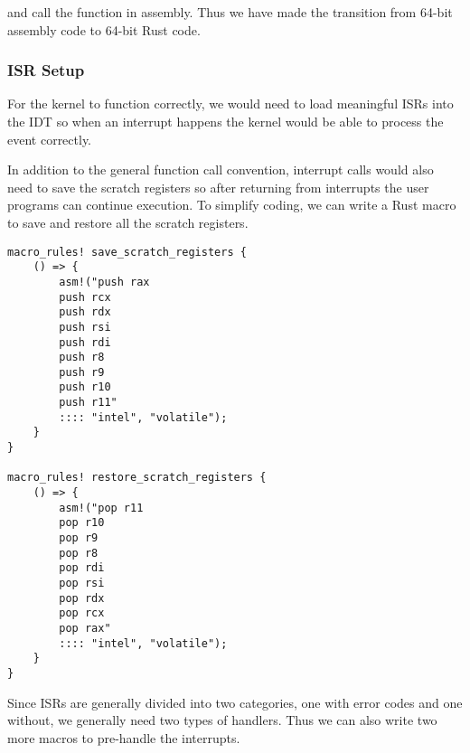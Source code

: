 \documentclass[conference]{IEEEtran}
\begin{document}
and call the function in assembly. Thus we have made the transition from 64-bit assembly code to 64-bit Rust code.

\subsubsection{ISR Setup}

For the kernel to function correctly, we would need to load meaningful ISRs into the IDT so when an interrupt happens the kernel would be able to process the event correctly.

In addition to the general function call convention, interrupt calls would also need to save the scratch registers so after returning from interrupts the user programs can continue execution. To simplify coding, we can write a Rust macro to save and restore all the scratch registers.

\begin{verbatim}
macro_rules! save_scratch_registers {
    () => {
        asm!("push rax
        push rcx
        push rdx
        push rsi
        push rdi
        push r8
        push r9
        push r10
        push r11"
        :::: "intel", "volatile");
    }
}

macro_rules! restore_scratch_registers {
    () => {
        asm!("pop r11
        pop r10
        pop r9
        pop r8
        pop rdi
        pop rsi
        pop rdx
        pop rcx
        pop rax"
        :::: "intel", "volatile");
    }
}
\end{verbatim}

Since ISRs are generally divided into two categories, one with error codes and one without, we generally need two types of handlers. Thus we can also write two more macros to pre-handle the interrupts.
\end{document}
